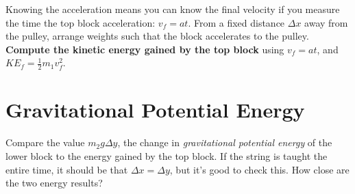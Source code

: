 \documentclass{article}
\begin{document}
Knowing the acceleration means you can know the final velocity if you measure the time the top block acceleration: $v_f = a t$.  From a fixed distance $\Delta x$ away from the pulley, arrange weights such that the block accelerates to the pulley.  \textbf{Compute the kinetic energy gained by the top block} using $v_f = a t$, and $KE_f = \frac{1}{2} m_1 v_f^2$. \\ \vspace{3cm}

\section{Gravitational Potential Energy}

Compare the value $m_2 g \Delta y$, the change in \textit{gravitational potential energy} of the lower block to the energy gained by the top block.  If the string is taught the entire time, it should be that $\Delta x = \Delta y$, but it's good to check this.  How close are the two energy results?
\end{document}

